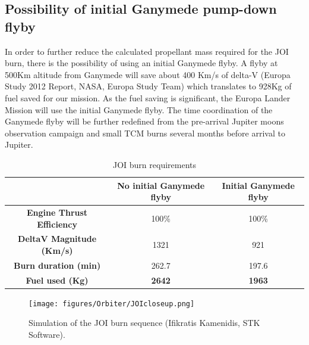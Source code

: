 \subsection*{Possibility of initial Ganymede pump-down flyby}
In order to further reduce the calculated propellant mass required for the JOI burn, there is the possibility of using an initial Ganymede flyby. A flyby at 500Km altitude from Ganymede will save about 400 Km/s of delta-V (Europa Study 2012 Report, NASA, Europa Study Team) 
which translates to 928Kg of fuel saved for our mission. As the fuel saving is significant, the Europa Lander Mission will use the initial Ganymede flyby. The time coordination of the Ganymede flyby will be further redefined from the pre-arrival Jupiter moons observation campaign and small TCM burns several months before arrival to Jupiter.
\begin{table}[h!]
  \centering
    \begin{tabular}{|c|c|c|}
    \hline
    \textbf{} & No initial Ganymede flyby & Initial Ganymede flyby \bigstrut\\
    \hline
    \textbf{Engine Thrust Efficiency} & 100\% & 100\% \bigstrut\\
    \hline
    \textbf{DeltaV Magnitude (Km/s)} & 1321  & 921 \bigstrut\\
    \hline
    \textbf{Burn duration (min)} & 262.7 & 197.6 \bigstrut\\
    \hline
    \textbf{Fuel used (Kg)} & \textbf{2642} & \textbf{1963} \bigstrut\\
    \hline
    \end{tabular}%
    \caption{JOI burn requirements}
  \label{tab:joi_burn}%
\end{table}%

\begin{figure}[h!]
\centering
\texttt{[image: figures/Orbiter/JOIcloseup.png]}
\caption{Simulation of the JOI burn sequence (Ifikratis Kamenidis, STK Software).}
\label{fig:joicloseup}
\end{figure}

